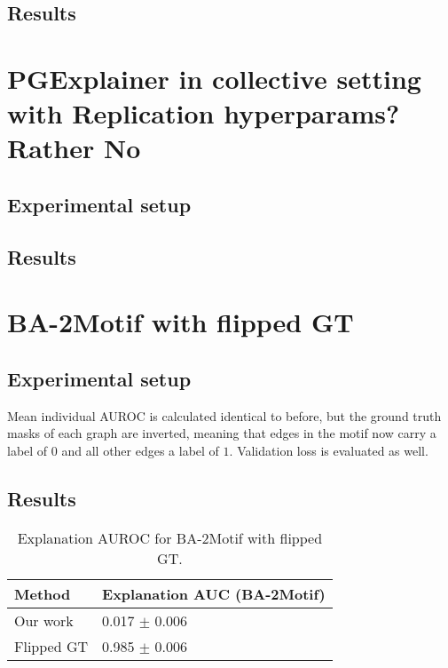 \subsection{Results}

\section{PGExplainer in collective setting with Replication hyperparams? Rather No}

\subsection{Experimental setup}

\subsection{Results}


\section{BA-2Motif with flipped GT}

\subsection{Experimental setup}
Mean individual AUROC is calculated identical to before, but the ground truth masks of each graph are inverted, meaning that edges in the motif now carry a label of $0$ and all other edges a label of $1$. Validation loss is evaluated as well.

\subsection{Results}

\begin{table}[ht]
    \centering
    \scriptsize
    \begin{tabularx}{0.4\textwidth}{l X}
        \toprule
        \textbf{Method} & \textbf{Explanation AUC (BA-2Motif)} \\
        \midrule
        Our work       & 0.017 $\pm$ 0.006 \\
        Flipped GT     & 0.985 $\pm$ 0.006 \\
        \bottomrule
    \end{tabularx}
    \caption{Explanation AUROC for BA-2Motif with flipped GT.}
    \label{tab:allmotifnodes_selected}
\end{table}

